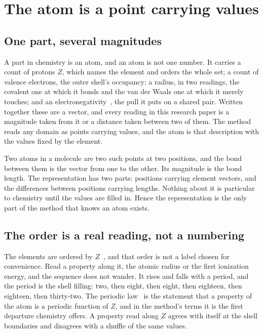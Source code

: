\chapter{The atom is a point carrying values}

\section{One part, several magnitudes}

A part in chemistry is an atom, and an atom is not one number. It carries a count of protons \(Z\),
which names the element and orders the whole set; a count of valence electrons, the outer
shell's occupancy; a radius, in two readings, the covalent one at which it bonds and the van der
Waals one at which it merely touches; and an electronegativity~\cite{src:Pauling-1932}, the pull it puts on a shared pair.
Written together these are a vector, and every reading in this research paper is a magnitude taken from it or a
distance taken between two of them. The method reads any domain as points carrying values, and the
atom is that description with the values fixed by the element.

Two atoms in a molecule are two such points at two positions, and the bond between them is the
vector from one to the other. Its magnitude is the bond length. The representation has two
parts: positions carrying element vectors, and the differences between positions carrying
lengths. Nothing about it is particular to chemistry until the values are filled in. Hence the
representation is the only part of the method that knows an atom exists.

\section{The order is a real reading, not a numbering}

The elements are ordered by \(Z\)~\cite{src:Moseley-1913}, and that order is not a label chosen for convenience. Read a
property along it, the atomic radius or the first ionization energy, and the sequence does not
wander. It rises and falls with a period, and the period is the shell filling: two, then eight, then
eight, then eighteen, then eighteen, then thirty-two. The periodic law~\cite{src:Mendeleev-1869} is the statement that a
property of the atom is a periodic function of \(Z\), and in the method's terms it is the first
departure chemistry offers. A property read along \(Z\) agrees with itself at the shell boundaries and
disagrees with a shuffle of the same values.


